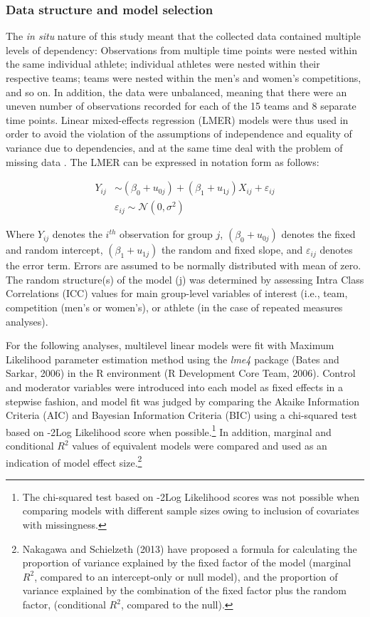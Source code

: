 \begin{CJK}{UTF8}{gbsn}
\subsubsection{Data structure and model selection\label{survey:dataStructureModelSelection}}
The \textit{in situ} nature of this study meant that the collected data contained multiple levels of dependency: Observations from multiple time points were nested within the same individual athlete; individual athletes were nested within their respective teams; teams were nested within the men’s and women’s competitions, and so on.  In addition, the data were unbalanced, meaning that there were an uneven number of observations recorded for each of the 15 teams and 8 separate time points. Linear mixed-effects regression (LMER) models were thus used in order to avoid the violation of the assumptions of independence and equality of variance due to dependencies, and at the same time deal with the problem of missing data \citep{Quene2004,Field2012}.  The LMER can be expressed in notation form as follows:

    \begin{align*}
      Y_{ij} & \sim  (\beta_{0} + u_{0j}) + (\beta_{1} + u_{1j})X_{ij} + \varepsilon_{ij}\\
           & \varepsilon_{ij} \sim \mathcal{N}(0,\sigma^{2})
    \end{align*}

Where $Y_{ij}$ denotes the $i^{th}$ observation for group $j$, $(\beta_{0} + u_{0j})$ denotes the fixed and random intercept, $(\beta_{1} + u_{1j})$ the random and fixed slope, and $\varepsilon_{ij}$ denotes the error term.  Errors are assumed to be normally distributed with mean of zero.  The random structure(s) of the model (j) was determined by assessing Intra Class Correlations (ICC) values for main group-level variables of interest (i.e., team, competition (men's or women's), or athlete (in the case of repeated measures analyses).

For the following analyses, multilevel linear models were fit with Maximum Likelihood parameter estimation method using the \textit{lme4} package (Bates and Sarkar, 2006) in the R environment (R Development Core Team, 2006).  Control and moderator variables were introduced into each model as fixed effects in a stepwise fashion, and model fit was judged by comparing the Akaike Information Criteria (AIC) and Bayesian Information Criteria (BIC) using a chi-squared test based on -2Log Likelihood score when possible.\footnote{The chi-squared test based on -2Log Likelihood scores was not possible when comparing models with different sample sizes owing to inclusion of covariates with missingness.} In addition, marginal and conditional $R^2$ values of equivalent models were compared and used as an indication of model effect size.\footnote{Nakagawa and Schielzeth (2013) have proposed a formula for calculating the proportion of variance explained by the fixed factor of the model (marginal $R^2$, compared to an intercept-only or null model), and the proportion of variance explained by the combination of the fixed factor plus the random factor, (conditional $R^2$, compared to the null).}



\end{CJK}
